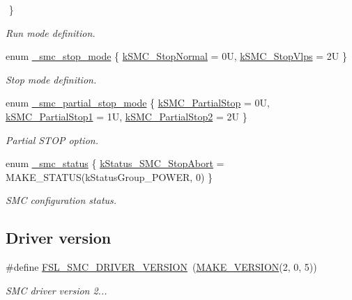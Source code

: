 \begin{DoxyCompactItemize}
$$ \}
\begin{DoxyCompactList}\small\item\em Run mode definition. \end{DoxyCompactList}\item 
enum \mbox{\hyperlink{group__smc_ga107d1c64902b4a1a0270a51008b854d5}{\+\_\+smc\+\_\+stop\+\_\+mode}} \{ \mbox{\hyperlink{group__smc_gga107d1c64902b4a1a0270a51008b854d5ac642d13640f334c1c509aa89568028dc}{k\+S\+M\+C\+\_\+\+Stop\+Normal}} = 0U, 
\mbox{\hyperlink{group__smc_gga107d1c64902b4a1a0270a51008b854d5a0309375b2672e8c29eebd50bd80236c3}{k\+S\+M\+C\+\_\+\+Stop\+Vlps}} = 2U
 \}
\begin{DoxyCompactList}\small\item\em Stop mode definition. \end{DoxyCompactList}\item 
enum \mbox{\hyperlink{group__smc_gaa8d9e56e87c773e0c77995ba8f7fbef1}{\+\_\+smc\+\_\+partial\+\_\+stop\+\_\+mode}} \{ \mbox{\hyperlink{group__smc_ggaa8d9e56e87c773e0c77995ba8f7fbef1a04f63da1ef433f2240cc42337c55e1b0}{k\+S\+M\+C\+\_\+\+Partial\+Stop}} = 0U, 
\mbox{\hyperlink{group__smc_ggaa8d9e56e87c773e0c77995ba8f7fbef1a2ebc7dc8a6bd5f83dd842cddcc6483a3}{k\+S\+M\+C\+\_\+\+Partial\+Stop1}} = 1U, 
\mbox{\hyperlink{group__smc_ggaa8d9e56e87c773e0c77995ba8f7fbef1afca17db21b7e59ecd2e271e566001b63}{k\+S\+M\+C\+\_\+\+Partial\+Stop2}} = 2U
 \}
\begin{DoxyCompactList}\small\item\em Partial S\+T\+OP option. \end{DoxyCompactList}\item 
enum \mbox{\hyperlink{group__smc_gabecec62029f0326a4d132d680946ac14}{\+\_\+smc\+\_\+status}} \{ \mbox{\hyperlink{group__smc_ggabecec62029f0326a4d132d680946ac14ac8b70e0e27736678bcb91340b06c011e}{k\+Status\+\_\+\+S\+M\+C\+\_\+\+Stop\+Abort}} = M\+A\+K\+E\+\_\+\+S\+T\+A\+T\+US(k\+Status\+Group\+\_\+\+P\+O\+W\+ER, 0)
 \}
\begin{DoxyCompactList}\small\item\em S\+MC configuration status. \end{DoxyCompactList}\end{DoxyCompactItemize}
\subsection*{Driver version}
\begin{DoxyCompactItemize}
\item 
\mbox{\label{group__smc_ga2da32483d11c4177371c992631d5680c}} 
\#define \mbox{\hyperlink{group__smc_ga2da32483d11c4177371c992631d5680c}{F\+S\+L\+\_\+\+S\+M\+C\+\_\+\+D\+R\+I\+V\+E\+R\+\_\+\+V\+E\+R\+S\+I\+ON}}~(\mbox{\hyperlink{group__ftfx__utilities_ga812138aa3315b0c6953c1a26130bcc37}{M\+A\+K\+E\+\_\+\+V\+E\+R\+S\+I\+ON}}(2, 0, 5))
\begin{DoxyCompactList}\small\item\em S\+MC driver version 2... \end{DoxyCompactList}\end{DoxyCompactItemize}
